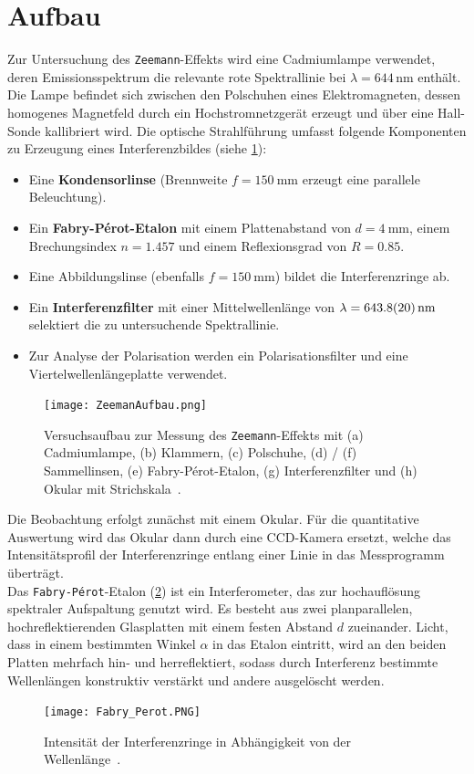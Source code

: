 \section{Aufbau}
Zur Untersuchung des \texttt{Zeemann}-Effekts wird eine Cadmiumlampe verwendet, deren Emissionsspektrum die relevante rote Spektrallinie bei $\lambda = 644 \, \mathrm{nm}$ enthält. Die Lampe befindet sich zwischen den Polschuhen eines Elektromagneten, dessen homogenes Magnetfeld durch ein Hochstromnetzgerät erzeugt und über eine Hall-Sonde kallibriert wird. Die optische Strahlführung umfasst folgende Komponenten zu Erzeugung eines Interferenzbildes (siehe \cref{fig:aufbau_zeemann}):
\begin{itemize}
    \item Eine \textbf{Kondensorlinse} (Brennweite $f = \SI{150}{\milli\meter}$ erzeugt eine parallele Beleuchtung).
    \item Ein \textbf{Fabry-Pérot-Etalon} mit einem Plattenabstand von $d = \SI{4}{\milli\meter}$, einem Brechungsindex $n = 1.457$ und einem Reflexionsgrad von $R = 0.85$.
    \item Eine Abbildungslinse (ebenfalls $f = \SI{150}{\milli\meter}$) bildet die Interferenzringe ab.
    \item Ein \textbf{Interferenzfilter} mit einer Mittelwellenlänge von $\lambda = \SI{643,8\pm 2,0}{\nano\meter}$ selektiert die zu untersuchende Spektrallinie.
    \item Zur Analyse der Polarisation werden ein Polarisationsfilter und eine Viertelwellenlängeplatte verwendet.
\end{itemize}
\begin{figure}[ht]
    \centering
    \texttt{[image: ZeemanAufbau.png]}
    \caption[Aufbau der Versuchsanordnung zum Zeemann-Effekt]{Versuchsaufbau zur Messung des \texttt{Zeemann}-Effekts mit (a) Cadmiumlampe, (b) Klammern, (c) Polschuhe, (d) / (f) Sammellinsen, (e) Fabry-Pérot-Etalon, (g) Interferenzfilter und (h) Okular mit Strichskala~\cite{LD}.}\label{fig:aufbau_zeemann}
\end{figure}
Die Beobachtung erfolgt zunächst mit einem Okular. Für die quantitative Auswertung wird das Okular dann durch eine CCD-Kamera ersetzt, welche das Intensitätsprofil der Interferenzringe entlang einer Linie in das Messprogramm überträgt.
\vspace{0.3cm}\\
Das \texttt{Fabry-Pérot}-Etalon (\cref{fig:fabry_perot}) ist ein Interferometer, das zur hochauflösung spektraler Aufspaltung genutzt wird. Es besteht aus zwei planparallelen, hochreflektierenden Glasplatten mit einem festen Abstand $d$ zueinander. Licht, dass in einem bestimmten Winkel $\alpha$ in das Etalon eintritt, wird an den beiden Platten mehrfach hin- und herreflektiert, sodass durch Interferenz bestimmte Wellenlängen konstruktiv verstärkt und andere ausgelöscht werden.
\begin{figure}[ht]
    \centering
    \texttt{[image: Fabry\_Perot.PNG]}
    \caption[Fabry-Pérot-Etalon]{Intensität der Interferenzringe in Abhängigkeit von der Wellenlänge~\cite{LD}.}\label{fig:fabry_perot}
\end{figure}

